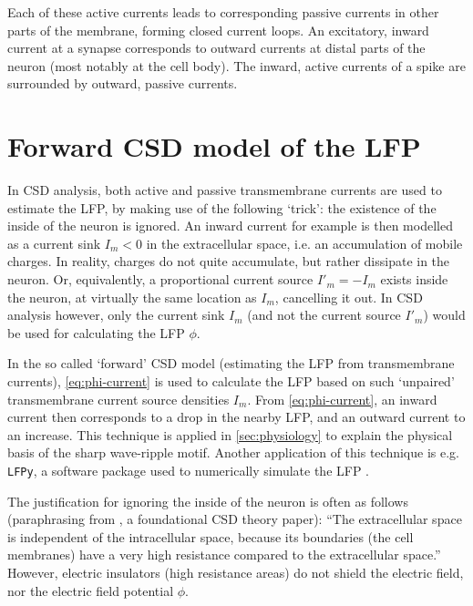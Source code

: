 
Each of these active currents leads to corresponding passive currents in other parts of the membrane, forming closed current loops. An excitatory, inward current at a synapse corresponds to outward currents at distal parts of the neuron (most notably at the cell body). The inward, active currents of a spike are surrounded by outward, passive currents.



\section{Forward CSD model of the LFP}
\label{forward-CSD}

In CSD analysis, both active and passive transmembrane currents are used to estimate the LFP, by making use of the following `trick': the existence of the inside of the neuron is ignored. An inward current for example is then modelled as a current sink $I_m < 0$ in the extracellular space, i.e. an accumulation of mobile charges. In reality, charges do not quite accumulate, but rather dissipate in the neuron. Or, equivalently, a proportional current source $I'_m = -I_m$ exists inside the neuron, at virtually the same location as $I_m$, cancelling it out. In CSD analysis however, only the current sink $I_m$ (and not the current source $I'_m$) would be used for calculating the LFP $\phi$.

In the so called `forward' CSD model (estimating the LFP from transmembrane currents), \cref{eq:phi-current} is used to calculate the LFP based on such `unpaired' transmembrane current source densities $I_m$. From \cref{eq:phi-current}, an inward current then corresponds to a drop in the nearby LFP, and an outward current to an increase. This technique is applied in \cref{sec:physiology} to explain the physical basis of the sharp wave-ripple motif. Another application of this technique is e.g. \texttt{LFPy}, a software package used to numerically simulate the LFP \cite{Linden2014}.

The justification for ignoring the inside of the neuron is often as follows (paraphrasing from \cite{Mitzdorf1985}, a foundational CSD theory paper): ``The extracellular space is independent of the intracellular space, because its boundaries (the cell membranes) have a very high resistance compared to the extracellular space.'' However, electric insulators (high resistance areas) do not shield the electric field, nor the electric field potential $\phi$.

